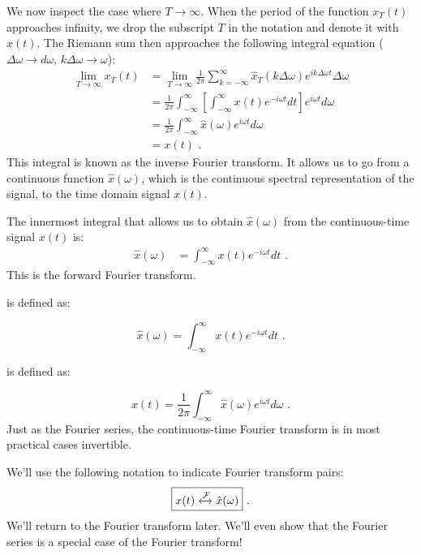 We now inspect the case where $T\rightarrow \infty$. When the period of the function $x_{T}(t)$ approaches infinity, we drop the subscript $T$ in the notation and denote it with $x(t)$.  The Riemann sum then approaches the following integral equation ($\Delta\omega \rightarrow d\omega$, $k\Delta\omega \rightarrow \omega$):
\begin{align}
\lim_{T\rightarrow \infty} x_{T}(t)  &= \lim_{T\rightarrow \infty}\frac{1}{2\pi} \sum_{k=-\infty}^{\infty} \hat{x}_{T}(k\Delta \omega) e^{ik\Delta \omega t}\Delta\omega \\
&=\frac{1}{2\pi}\int_{-\infty}^{\infty} \left[\int_{-\infty}^{\infty} x(t) e^{-i\omega t} dt\right] e^{i\omega t}d\omega\\
&= \frac{1}{2\pi} \int_{-\infty}^{\infty} \hat{x}(\omega) e^{i\omega t}d\omega\\
&= x(t) \,\,.
\end{align}
This integral is known as the inverse Fourier transform. It allows us to go from a continuous function $\hat{x}(\omega)$, which is the continuous spectral representation of the signal, to the time domain signal $x(t)$.

The innermost integral that allows us to obtain $\hat{x}(\omega)$ from the continuous-time signal $x(t)$ is:
\begin{align}
\hat{x}(\omega)  &= \int_{-\infty}^{\infty} x(t) e^{-i\omega t} dt \,\,.
\end{align}
This is the forward Fourier transform.

 is defined as:

\begin{equation}
\boxed{
\hat{x}(\omega) = \int_{-\infty}^{\infty} x(t) e^{-i\omega t}dt
} \,\,.
\end{equation}

 is defined as:

\begin{equation}
\boxed{
x(t) = \frac{1}{2\pi}\int_{-\infty}^{\infty} \hat{x}(\omega) e^{i\omega t}d\omega
} \,\,.
\end{equation}
Just as the Fourier series, the continuous-time Fourier transform is in most practical cases invertible.

We'll use the following notation to indicate Fourier transform pairs:
\begin{equation}
\boxed{
x(t) \xleftrightarrow{\mathcal{F}} \hat{x}(\omega)
} \,\,.
\end{equation}
We'll return to the Fourier transform later. We'll even show that the Fourier series is a special case of the Fourier transform!

